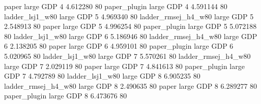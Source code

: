               paper      large      GDP                 4  4.612280 80
       paper_plugin      large      GDP                 4  4.591144 80
    ladder_lsj1_w80      large      GDP                 5  4.969340 80
ladder_rmsej_h4_w80      large      GDP                 5  2.548913 80
              paper      large      GDP                 5  4.996254 80
       paper_plugin      large      GDP                 5  5.072188 80
    ladder_lsj1_w80      large      GDP                 6  5.186946 80
ladder_rmsej_h4_w80      large      GDP                 6  2.138205 80
              paper      large      GDP                 6  4.959101 80
       paper_plugin      large      GDP                 6  5.020965 80
    ladder_lsj1_w80      large      GDP                 7  5.570261 80
ladder_rmsej_h4_w80      large      GDP                 7  2.029119 80
              paper      large      GDP                 7  4.841613 80
       paper_plugin      large      GDP                 7  4.792789 80
    ladder_lsj1_w80      large      GDP                 8  6.905235 80
ladder_rmsej_h4_w80      large      GDP                 8  2.490635 80
              paper      large      GDP                 8  6.289277 80
       paper_plugin      large      GDP                 8  6.473676 80
